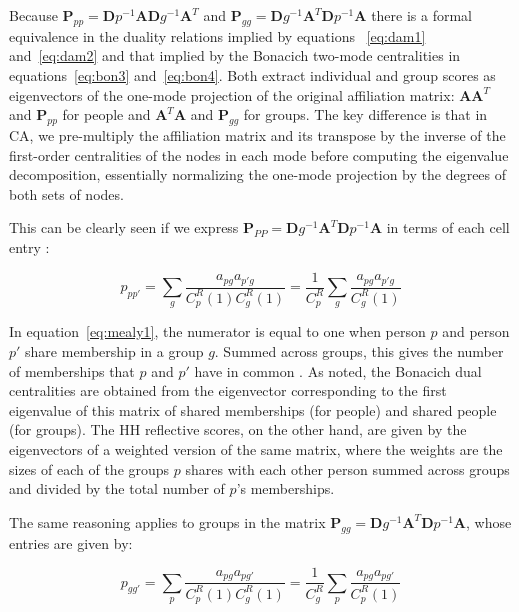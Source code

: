 \documentclass[a4paper,fleqn]{cas-sc}
\begin{document}
Because $\mathbf{P}_{pp} = \mathbf{D}p^{-1}\mathbf{A}\mathbf{D}g^{-1}\mathbf{A}^T$ and $\mathbf{P}_{gg} = \mathbf{D}g^{-1}\mathbf{A}^T\mathbf{D}p^{-1}\mathbf{A}$ there is a formal equivalence in the duality relations implied by equations ~\ref{eq:dam1} and~\ref{eq:dam2} and that implied by the Bonacich two-mode centralities in equations~\ref{eq:bon3} and~\ref{eq:bon4}. Both extract individual and group scores as eigenvectors of the one-mode projection of the original affiliation matrix: $\mathbf{AA}^T$ and $\mathbf{P}_{pp}$ for people and $\mathbf{A}^T\mathbf{A}$ and $\mathbf{P}_{gg}$ for groups. The key difference is that in CA, we pre-multiply the affiliation matrix and its transpose by the inverse of the first-order centralities of the nodes in each mode before computing the eigenvalue decomposition, essentially normalizing the one-mode projection by the degrees of both sets of nodes. 

This can be clearly seen if we express $\mathbf{P}_{PP}= \mathbf{D}g^{-1}\mathbf{A}^T\mathbf{D}p^{-1}\mathbf{A}$ in terms of each cell entry \cite[eq. 4]{mealy2019interpreting}:

\begin{equation}
    p_{pp'} = \sum_g\frac{a_{pg}a_{p'g}}{C^R_p(1)C^R_g(1)} = 
    \frac{1}{C^R_p}\sum_g\frac{a_{pg}a_{p'g}}{C^R_g(1)}
    \label{eq:mealy1}
\end{equation}

In equation~\ref{eq:mealy1}, the numerator is equal to one when person $p$ and person $p'$ share membership in a group $g$. Summed across groups, this gives the number of memberships that $p$ and $p'$ have in common \citep{breiger1974duality}. As noted, the Bonacich dual centralities are obtained from the eigenvector corresponding to the first eigenvalue of this matrix of shared memberships (for people) and shared people (for groups). The HH reflective scores, on the other hand, are given by the eigenvectors of a weighted version of the same matrix, where the weights are the sizes of each of the groups $p$ shares with each other person summed across groups and divided by the total number of $p$'s memberships. 

The same reasoning applies to groups in the matrix $\mathbf{P}_{gg} = \mathbf{D}g^{-1}\mathbf{A}^T\mathbf{D}p^{-1}\mathbf{A}$, whose entries are given by:

\begin{equation}
    p_{gg'} = \sum_p\frac{a_{pg}a_{pg'}}{C^R_p(1)C^R_g(1)} = 
    \frac{1}{C^R_g}\sum_p\frac{a_{pg}a_{pg'}}{C^R_p(1)}
    \label{eq:mealy2}
\end{equation}
\end{document}
